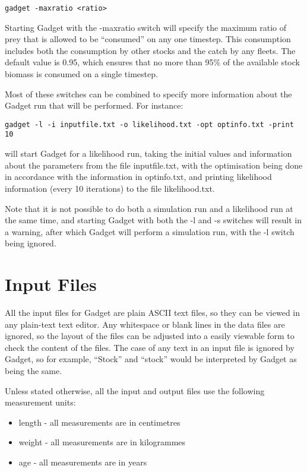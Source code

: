 \documentclass[]{book}
\begin{document}
\begin{verbatim}
gadget -maxratio <ratio>
\end{verbatim}

Starting Gadget with the -maxratio switch will specify the maximum ratio
of prey that is allowed to be ``consumed'' on any one timestep. This
consumption includes both the consumption by other stocks and the catch
by any fleets. The default value is 0.95, which ensures that no more
than 95\% of the available stock biomass is consumed on a single
timestep.

Most of these switches can be combined to specify more information about
the Gadget run that will be performed. For instance:

\begin{verbatim}
gadget -l -i inputfile.txt -o likelihood.txt -opt optinfo.txt -print 10
\end{verbatim}

will start Gadget for a likelihood run, taking the initial values and
information about the parameters from the file inputfile.txt, with the
optimisation being done in accordance with the information in
optinfo.txt, and printing likelihood information (every 10 iterations)
to the file likelihood.txt.

Note that it is not possible to do both a simulation run and a
likelihood run at the same time, and starting Gadget with both the -l
and -s switches will result in a warning, after which Gadget will
perform a simulation run, with the -l switch being ignored.

\hypertarget{chap:input}{%
\chapter{Input Files}\label{chap:input}}

All the input files for Gadget are plain ASCII text files, so they can
be viewed in any plain-text text editor. Any whitespace or blank lines
in the data files are ignored, so the layout of the files can be
adjusted into a easily viewable form to check the content of the files.
The case of any text in an input file is ignored by Gadget, so for
example, ``Stock'' and ``stock'' would be interpreted by Gadget as being the
same.

Unless stated otherwise, all the input and output files use the
following measurement units:

\begin{itemize}
\item
  length - all measurements are in centimetres
\item
  weight - all measurements are in kilogrammes
\item
  age - all measurements are in years
\end{itemize}
\end{document}
